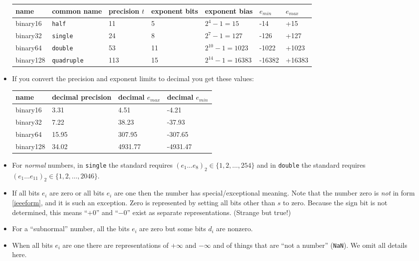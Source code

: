 \documentclass[11pt]{amsart}
\begin{document}
\begin{itemize}
\bigskip
\small
\begin{tabular}{lllllll}
name     & common name & precision $t$ & exponent bits & exponent bias & $e_{min}$ & $e_{max}$ \\ \hline
binary16 &      \texttt{half} & 11 &  5 &      $2^4-1=15$ &   -14 &   +15 \\
binary32 &    \texttt{single} & 24 &  8 &     $2^7-1=127$ &  -126 &  +127 \\
binary64 &    \texttt{double} & 53 & 11 & $2^{10}-1=1023$ & -1022 & +1023 \\
binary128 &\texttt{quadruple} &113 & 15 &$2^{14}-1=16383$ &-16382 &+16383
\end{tabular}
\normalsize
\medskip

\item If you convert the precision and exponent limits to decimal you get these values:

\bigskip
\small
\begin{tabular}{llll}
name & decimal precision & decimal $e_{max}$ & decimal $e_{min}$ \\ \hline
binary16 & 3.31 & 4.51 & -4.21 \\
binary32 & 7.22 & 38.23 & -37.93 \\
binary64 & 15.95 & 307.95 & -307.65 \\
binary128 & 34.02 & 4931.77 & -4931.47
\end{tabular}
\normalsize
\medskip

\item For \emph{normal} numbers, in \texttt{single} the standard requires $\left(e_1\dots e_8\right)_2 \in \{1,2,\dots,254\}$ and in \texttt{double} the standard requires $\left(e_1\dots e_{11}\right)_2 \in \{1,2,\dots,2046\}$.

\item If all bits $e_i$ are zero or all bits $e_i$ are one then the number has special/exceptional meaning.  Note that the number zero is \emph{not} in form \eqref{ieeeform}, and it is such an exception.  Zero is represented by setting all bits other than $s$ to zero.  Because the sign bit is not determined, this means ``$+0$'' and ``$-0$'' exist as separate representations.  (Strange but true!)

\item For a ``subnormal'' number, all the bits $e_i$ are zero but some bits $d_i$ are nonzero.

\item When all bits $e_i$ are one there are representations of $+\infty$ and $-\infty$ and of things that are ``not a number'' (\texttt{NaN}).  We omit all details here.  


\end{itemize}
\end{document}
